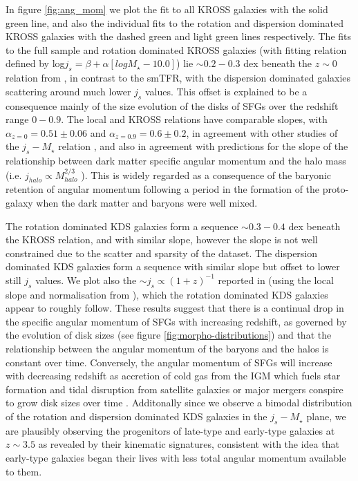 \documentclass[fleqn,usenatbib]{mn2e}
\begin{document}
In figure \ref{fig:ang_mom} we plot the fit to all KROSS galaxies with the solid green line, and also the individual fits to the rotation and dispersion dominated KROSS galaxies with the dashed green and light green lines respectively.
The fits to the full sample and rotation dominated KROSS galaxies (with fitting relation defined by log$j_{s} =  \beta + \alpha[logM_{\star} - 10.0]$) lie $\sim0.2-0.3$ dex beneath the $z\sim0$ relation from \cite{Romanowsky2012}, in contrast to the smTFR, with the dispersion dominated galaxies scattering around much lower $j_{s}$ values.
This offset is explained to be a consequence mainly of the size evolution of the disks of SFGs over the redshift range $0-0.9$.
The local and KROSS relations have comparable slopes, with $\alpha_{z=0}=0.51\pm0.06$ and $\alpha_{z=0.9}=0.6\pm0.2$, in agreement with other studies of the $j_{s}-M_{\star}$ relation \citep{Cortese2016,Contini2015a,Burkert2016a,Swinbank2017}, and also in agreement with predictions for the slope of the relationship between dark matter specific angular momentum and the halo mass (i.e. $j_{halo} \propto M_{halo}^{2/3}$ \citep[e.g.][]{Barnes1987}).
This is widely regarded as a consequence of the baryonic retention of angular momentum following a period in the formation of the proto-galaxy when the dark matter and baryons were well mixed.

The rotation dominated KDS galaxies form a sequence $\sim 0.3-0.4$ dex beneath the KROSS relation, and with similar slope, however the slope is not well constrained due to the scatter and sparsity of the dataset.
The dispersion dominated KDS galaxies form a sequence with similar slope but offset to lower still $j_{s}$ values.
We plot also the $\sim j_{s} \propto (1+z)^{-1}$ reported in \cite{Swinbank2017} (using the local slope and normalisation from \cite{Romanowsky2012}), which the rotation dominated KDS galaxies appear to roughly follow.
These results suggest that there is a continual drop in the specific angular momentum of SFGs with increasing redshift, as governed by the evolution of disk sizes \citep[e.g.][]{Trujillo2007} (see figure \ref{fig:morpho-distributions}) and that the relationship between the angular momentum of the baryons and the halos is constant over time.
Conversely, the angular momentum of SFGs will increase with decreasing redshift as accretion of cold gas from the IGM which fuels star formation and tidal disruption from satellite galaxies or major mergers conspire to grow disk sizes over time \citep{Trujillo2007,Buitrago2008,VanderWel2014a}.
Additonally since we observe a bimodal distribution of the rotation and dispersion dominated KDS galaxies in the $j_{s}-M_{\star}$ plane, we are plausibly observing the progenitors of late-type and early-type galaxies at $z\sim3.5$ as revealed by their kinematic signatures, consistent with the idea that early-type galaxies began their lives with less total angular momentum available to them.  
\end{document}
